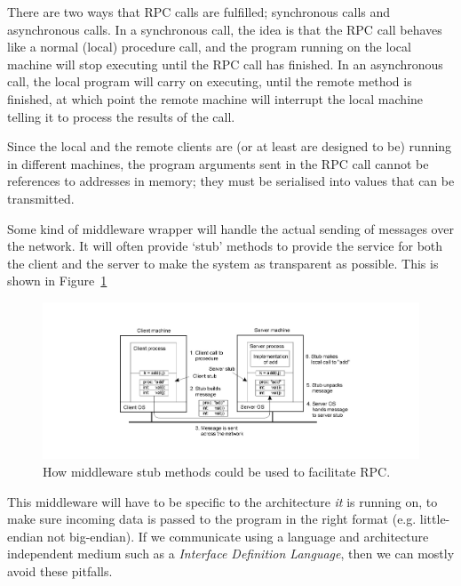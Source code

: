 There are two ways that RPC calls are fulfilled; synchronous calls and
asynchronous calls. In a synchronous call, the idea is that the RPC call behaves
like a normal (local) procedure call, and the program running on the local
machine will stop executing until the RPC call has finished. In an asynchronous
call, the local program will carry on executing, until the remote method is
finished, at which point the remote machine will interrupt the local machine
telling it to process the results of the call.


Since the local and the remote clients are (or at least are designed to be)
running in different machines, the program arguments sent in the RPC call cannot
be references to addresses in memory; they must be serialised into values that
can be transmitted.

Some kind of middleware wrapper will handle the actual sending of messages over
the network. It will often provide `stub' methods to provide the service for
both the client and the server to make the system as transparent as possible.
This is shown in Figure~\ref{rpc-stub}

\begin{figure}[H]
  \centering
  \includegraphics[width=\textwidth]{images/rpc-stub}
  \caption{How middleware stub methods could be used to facilitate RPC.}
  \label{rpc-stub}
\end{figure}

This middleware will have to be specific to the architecture \textit{it} is
running on, to make sure incoming data is passed to the program in the right
format (e.g. little-endian not big-endian). If we communicate using a language
and architecture independent medium such as a \textit{Interface Definition
Language}, then we can mostly avoid these pitfalls.

